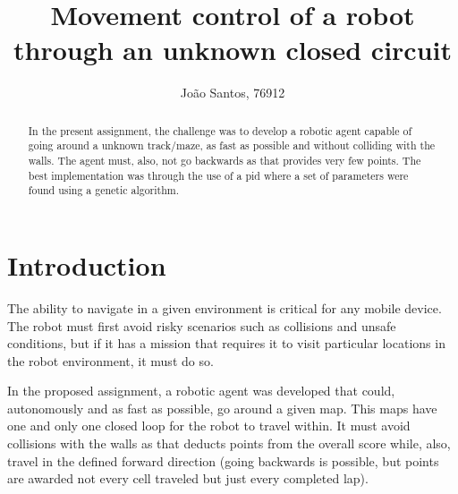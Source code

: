 \documentclass[runningheads]{llncs}
\begin{document}
%
\title{Movement control of a robot through an unknown closed circuit
}
%
%
\author{João Santos, 76912}
%
%
%
\maketitle              %
%
\begin{abstract}
In the present assignment, the challenge was to develop a robotic agent capable of going around a unknown track/maze, as fast as possible and without colliding with the walls. The agent must, also, not go backwards as that provides very few points. The best implementation was through the use of a \gls{pid} where a set of parameters were found using a genetic algorithm.

\end{abstract}
%
\section{Introduction}
\label{sec:introduction}

The ability to navigate in a given environment is critical for any mobile device. The robot must first avoid risky scenarios such as collisions and unsafe conditions, but if it has a mission that requires it to visit particular locations in the robot environment, it must do so.

In the proposed assignment, a robotic agent was developed that could, autonomously and as fast as possible, go around a given map. This maps have one and only one closed loop for the robot to travel within. It must avoid collisions with the walls as that deducts points from the overall score while, also, travel in the defined forward direction (going backwards is possible, but points are awarded not every cell traveled but just every completed lap).
\end{document}
